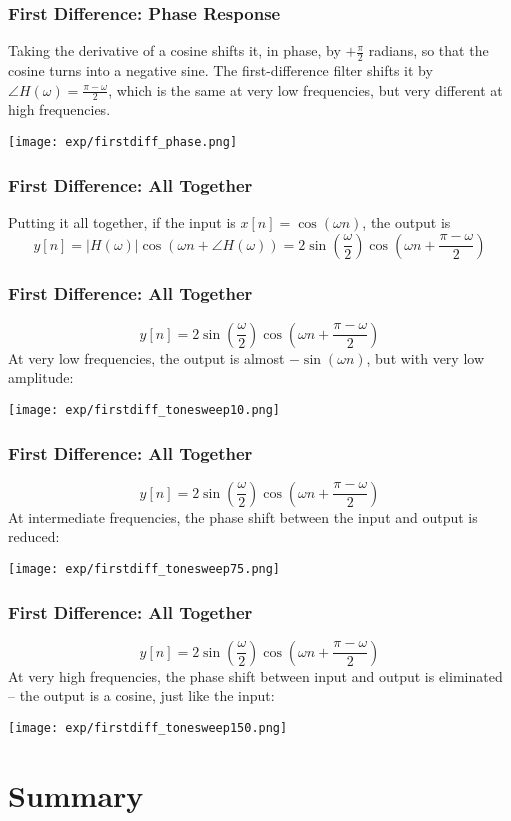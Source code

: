 \documentclass{beamer}
\begin{document}
\begin{frame}
  \frametitle{First Difference: Phase Response}

  Taking the derivative of a cosine shifts it, in phase, by
  $+\frac{\pi}{2}$ radians, so that the cosine turns into a negative
  sine.  The first-difference filter shifts it by $\angle
  H(\omega)=\frac{\pi-\omega}{2}$, which is the same at very low frequencies,
  but very different at high frequencies.
  \centerline{\texttt{[image: exp/firstdiff\_phase.png]}}
\end{frame}

\begin{frame}
  \frametitle{First Difference: All Together}
  Putting it all together, if the input is $x[n]=\cos(\omega n)$, the output is
  \[
  y[n]=|H(\omega)|\cos\left(\omega n+\angle H(\omega)\right)
  =2\sin\left(\frac{\omega}{2}\right)\cos\left(\omega n+\frac{\pi-\omega}{2}\right)
  \]
\end{frame}

\begin{frame}
  \frametitle{First Difference: All Together}
  \[
  y[n]=2\sin\left(\frac{\omega}{2}\right)\cos\left(\omega n+\frac{\pi-\omega}{2}\right)
  \]
  At very low frequencies, the output is almost $-\sin(\omega n)$, but
  with very low amplitude:
  \centerline{\texttt{[image: exp/firstdiff\_tonesweep10.png]}}
\end{frame}


\begin{frame}
  \frametitle{First Difference: All Together}
  \[
  y[n]=2\sin\left(\frac{\omega}{2}\right)\cos\left(\omega n+\frac{\pi-\omega}{2}\right)
  \]
  At intermediate frequencies, the phase shift between the input and output is reduced:
  \centerline{\texttt{[image: exp/firstdiff\_tonesweep75.png]}}
\end{frame}

\begin{frame}
  \frametitle{First Difference: All Together}
  \[
  y[n]=2\sin\left(\frac{\omega}{2}\right)\cos\left(\omega n+\frac{\pi-\omega}{2}\right)
  \]
  At very high frequencies, the phase shift between input and output
  is eliminated -- the output is a cosine, just like the input:
  \centerline{\texttt{[image: exp/firstdiff\_tonesweep150.png]}}
\end{frame}


\section[Summary]{Summary}
\setcounter{subsection}{1}
\end{document}
